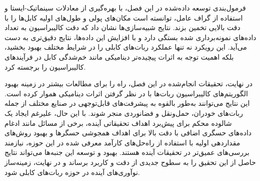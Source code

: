 فرمول‌بندی توسعه داده‌شده در این فصل، با بهره‌گیری از معادلات سینماتیک-ایستا و استفاده از گراف عامل، توانسته است مکان‌های پولی و طول‌های اولیه کابل‌ها را با دقت بالایی تخمین بزند. نتایج شبیه‌سازی‌ها نشان داد که دقت کالیبراسیون به تعداد داده‌های نمونه‌برداری شده بستگی دارد و با افزایش این داده‌ها، نتایج دقیق‌تری به دست می‌آید. این رویکرد نه تنها عملکرد ربات‌های کابلی را در شرایط مختلف بهبود بخشید، بلکه اهمیت توجه به اثرات پیچیده‌تر دینامیکی مانند خم‌شدگی کابل در فرآیندهای کالیبراسیون را برجسته کرد.

در نهایت، تحقیقات انجام‌شده در این فصل، راه را برای مطالعات بیشتر در زمینه بهبود الگوریتم‌های کالیبراسیون ربات‌ها با در نظر گرفتن اثرات دینامیکی هموار کرده است. این نتایج می‌توانند به‌طور بالقوه به پیشرفت‌های قابل‌توجهی در صنایع مختلف از جمله ربات‌های خودران، حمل‌ونقل و فضانوردی منجر شوند. با این حال، علیرغم ایجاد یک شالوده محکم برای پیش‌برد اهداف تحقیقاتی آینده، برخی از مسائل مانند ادغام داده‌های حسگری اضافی با دقت بالا برای اهداف همجوشی حسگرها و بهبود روش‌های مقداردهی اولیه با استفاده از راه‌حل‌های کارآمد معرفی شده در این حوزه، نیازمند بررسی‌های عمیق‌تر در تحقیقات آینده هستند. بهبود و توسعه این جنبه‌ها می‌تواند نتایج حاصل از این تحقیق را به سطوح جدیدی از دقت و کاربرد برساند و در نهایت، زمینه‌ساز نوآوری‌های آینده در حوزه ربات‌های کابلی شود.



